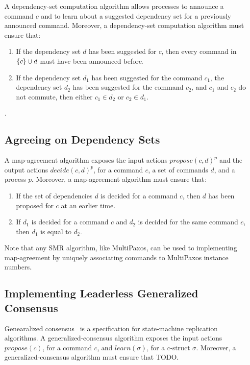 
A dependency-set computation algorithm allows processes to announce a command $c$ and to learn about a suggested dependency set for a previously announced command.
Moreover, a dependency-set computation algorithm must ensure that:
\begin{enumerate}
    \item If the dependency set $d$ has been suggested for $c$, then every command in $\left\{c\right\}\cup d$ must have been announced before.
    \item If the dependency set $d_1$ has been suggested for the command $c_1$, the dependency set $d_2$ has been suggested for the command $c_2$, and $c_1$ and $c_2$ do not commute, then either $c_1\in d_2$ or $c_2 \in d_1$.
\end{enumerate}

.

\subsection{Agreeing on Dependency Sets}

A map-agreement algorithm exposes the input actions ${propose\left( c, d \right)}^p$ and the output actions ${decide\left( c, d \right)}^p$, for a command $c$, a set of commands $d$, and a process $p$.
Moreover, a map-agreement algorithm must ensure that: 
\begin{enumerate}
    \item If the set of dependencies $d$ is decided for a command $c$, then $d$ has been proposed for $c$ at an earlier time.
    \item If $d_1$ is decided for a command $c$ and $d_2$ is decided for the same command $c$, then $d_1$ is equal to $d_2$.
\end{enumerate}
Note that any SMR algorithm, like MultiPaxos, can be used to implementing map-agreement by uniquely associating commands to MultiPaxos instance numbers.

\subsection{Implementing Leaderless Generalized Consensus}

Genearalized consensus~\cite{Lamport05GeneralizeConsensus} is a specification for state-machine replication algorithms. 
A generalized-consensus algorithm exposes the input actions $propose\left( c \right)$, for a command $c$, and $learn\left( \sigma \right)$, for a c-struct $\sigma$.
Moreover, a generalized-consensus algorithm must ensure that TODO.

